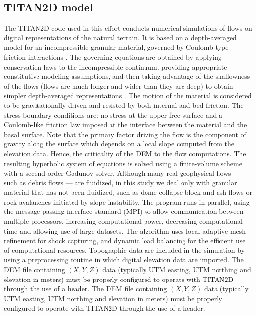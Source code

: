 \documentclass[a4paper,fleqn]{article}
\begin{document}
\subsection{TITAN2D model}

The TITAN2D code used in this effort conducts numerical simulations of
flows on digital representations of the natural terrain.  It is based
on a depth-averaged model for an incompressible granular material,
governed by Coulomb-type friction interactions \citep{Savage1989}.
The governing equations are obtained by applying conservation laws to
the incompressible continuum, providing appropriate constitutive
modeling assumptions, and then taking advantage of the shallowness of
the flows (flows are much longer and wider than they are deep) to
obtain simpler depth-averaged representations \citep{Patra2005}. The
motion of the material is considered to be gravitationally driven and
resisted by both internal and bed friction. The stress boundary
conditions are: no stress at the upper free-surface and a Coulomb-like
friction law imposed at the interface between the material and the
basal surface. Note that the primary factor driving the flow is the
component of gravity along the surface which depends on a local slope
computed from the elevation data.  Hence, the criticality of the DEM
to the flow computations. The resulting hyperbolic system of equations
is solved using a finite-volume scheme with a second-order Godunov
solver. Although many real geophysical flows --- such as debris flows
--- are fluidized, in this study we deal only with granular material
that has not been fluidized, such as dome-collapse block and ash flows
or rock avalanches initiated by slope instability.
The program runs in parallel, using the message passing interface
standard (MPI) to allow communication between multiple processors,
increasing computational power, decreasing computational time and
allowing use of large datasets. The algorithm uses local adaptive mesh
refinement for shock capturing, and dynamic load balancing for the
efficient use of computational resources. Topographic data are
included in the simulation by using a preprocessing routine in which
digital elevation data are imported. The DEM file containing $(X, Y,
Z)$ data (typically UTM easting, UTM northing and elevation in meters)
must be properly configured to operate with TITAN2D through the use of
a header. The DEM file containing $(X, Y,
Z)$ data (typically UTM easting, UTM northing and elevation in meters)
must be properly configured to operate with TITAN2D through the use of
a header.
\end{document}
